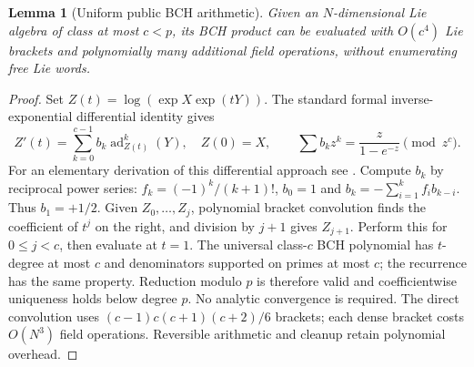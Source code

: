 \documentclass[11pt]{article}
\newtheorem{lemma}[theorem]{Lemma}
\theoremstyle{remark}
\begin{document}
\begin{lemma}[Uniform public BCH arithmetic]
Given an $N$-dimensional Lie algebra of class at most $c<p$, its BCH product
can be evaluated with $O(c^4)$ Lie brackets and polynomially many additional
field operations, without enumerating free Lie words.
\end{lemma}
\begin{proof}
Set $Z(t)=\log(\exp X\exp(tY))$. The standard formal inverse-exponential
differential identity gives
\[
 Z'(t)=\sum_{k=0}^{c-1}b_k\operatorname{ad}_{Z(t)}^k(Y),\quad Z(0)=X,
 \qquad \sum b_kz^k=\frac{z}{1-e^{-z}}\pmod {z^c}.
\]
For an elementary derivation of this differential approach see
\cite[Section 4.1]{wehler}. Compute $b_k$ by reciprocal power series:
$f_k=(-1)^k/(k+1)!$, $b_0=1$ and
$b_k=-\sum_{i=1}^k f_i b_{k-i}$. Thus $b_1=+1/2$.
Given $Z_0,\ldots,Z_j$, polynomial bracket convolution finds the
coefficient of $t^j$ on the right, and division by $j+1$ gives $Z_{j+1}$.
Perform this for $0\le j<c$, then evaluate at $t=1$.
The universal class-$c$ BCH polynomial has $t$-degree at most $c$ and
denominators supported on primes at most $c$; the recurrence has the same
property. Reduction modulo $p$ is therefore valid and coefficientwise
uniqueness holds below degree $p$. No analytic convergence is required.
The direct convolution uses
$(c-1)c(c+1)(c+2)/6$ brackets; each dense bracket costs $O(N^3)$ field
operations. Reversible arithmetic and cleanup retain polynomial overhead.
\end{proof}
\end{document}
